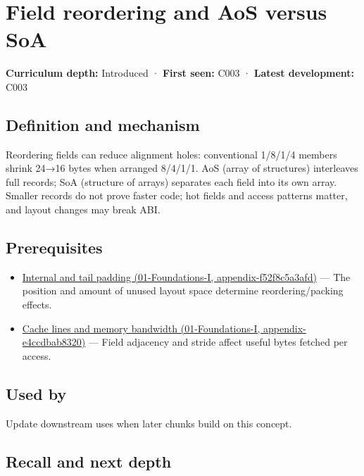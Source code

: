 \hypertarget{appendix-5522ad176ca0}{}
\section{Field reordering and AoS versus SoA}\label{appendix-5522ad176ca0-field-reordering-and-aos-versus-soa}

\textbf{Curriculum depth:} Introduced · \textbf{First seen:} C003 · \textbf{Latest development:} C003

\subsection{Definition and mechanism}\label{appendix-5522ad176ca0-definition-and-mechanism}

Reordering fields can reduce alignment holes: conventional 1/8/1/4 members shrink 24→16 bytes when arranged 8/4/1/1. AoS (array of structures) interleaves full records; SoA (structure of arrays) separates each field into its own array. Smaller records do not prove faster code; hot fields and access patterns matter, and layout changes may break ABI.

\subsection{Prerequisites}\label{appendix-5522ad176ca0-prerequisites}

\begin{itemize}
\tightlist
\item
  \href{../01-Foundations-I/main.pdf\#nameddest=appendix-f52f8c5a3afd}{Internal and tail padding (01-Foundations-I, appendix-f52f8c5a3afd)} --- The position and amount of unused layout space determine reordering/packing effects.
\item
  \href{../01-Foundations-I/main.pdf\#nameddest=appendix-e4ccdbab8320}{Cache lines and memory bandwidth (01-Foundations-I, appendix-e4ccdbab8320)} --- Field adjacency and stride affect useful bytes fetched per access.
\end{itemize}

\subsection{Used by}\label{appendix-5522ad176ca0-used-by}

Update downstream uses when later chunks build on this concept.

\subsection{Recall and next depth}\label{appendix-5522ad176ca0-recall-and-next-depth}

